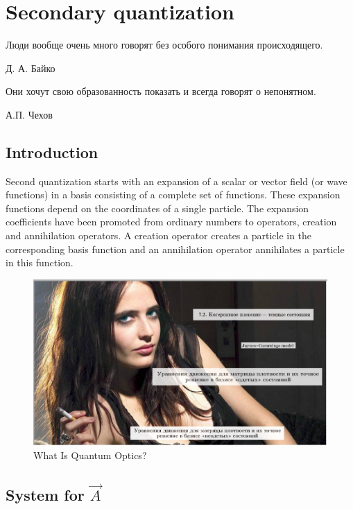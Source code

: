 \section{Secondary quantization}
	
	\begin{otherlanguage}{russian}	
		\epigraph{Люди вообще очень много говорят без особого понимания происходящего.}{Д. А. Байко}
		\epigraph{Они хочут свою образованность показать и всегда говорят о непонятном.}{А.П. Чехов}
	\end{otherlanguage}
	
	
	\subsection{Introduction}
	
	Second quantization starts with an expansion of a scalar or vector field (or wave functions) in a basis consisting of a complete set of functions. These expansion functions depend on the coordinates of a single particle. The expansion coefficients have been promoted from ordinary numbers to operators, creation and annihilation operators. A creation operator creates a particle in the corresponding basis function and an annihilation operator annihilates a particle in this function.
	\begin{figure}
		\centering
		\includegraphics[width=0.7\linewidth]{fig/L1/lpQgqT9gGX0}
		\caption{What Is Quantum Optics?}		
	\end{figure}
	
	
	\subsection{System for $\vec{A}$}
	
